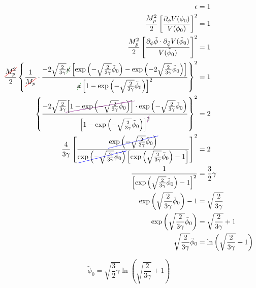 \begin{equation*}
    \begin{split}
        \epsilon &= 1\\
        \frac{M_p^2}{2} \left[ \frac{\partial_\phi V(\phi_0)}{V(\phi_0)} \right]^2 &= 1\\
        \frac{M_p^2}{2} \left[ \frac{\partial_{\phi} \tilde{\phi} \cdot \partial_{\tilde{\phi}} V(\tilde{\phi}_0)}{V(\tilde{\phi}_0)} \right]^2 &= 1\\
        \frac{\colorcancel{red}{M_p^2}}{2} \left\{ \frac{1}{\colorcancel{red}{M_p}} \cdot \frac{- 2 \sqrt{\frac{2}{3 \gamma}} \colorcancel{ForestGreen}{\kappa} \left[ \exp \left( - \sqrt{\frac{2}{3 \gamma}} \tilde{\phi}_0 \right) - \exp \left( - 2 \sqrt{\frac{2}{3 \gamma}} \tilde{\phi}_0 \right) \right]}{\colorcancel{ForestGreen}{\kappa} \left[ 1 - \exp \left( - \sqrt{\frac{2}{3 \gamma}} \tilde{\phi}_0 \right) \right]^2} \right\}^2 &= 1\\
        \left\{ \frac{- 2 \sqrt{\frac{2}{3 \gamma}} \colorcancel{violet}{\left[ 1 - \exp \left( - \sqrt{\frac{2}{3 \gamma}} \tilde{\phi}_0 \right) \right]} \cdot \exp \left( - \sqrt{\frac{2}{3 \gamma}} \tilde{\phi}_0 \right)}{\left[ 1 - \exp \left( - \sqrt{\frac{2}{3 \gamma}} \tilde{\phi}_0 \right) \right]^{\colorcancel{violet}{2}}} \right\}^2 &= 2\\
        \frac{4}{3 \gamma} \left[ \frac{\colorcancel{blue}{\exp \left( - \sqrt{\frac{2}{3 \gamma}} \tilde{\phi}_0 \right)}}{\colorcancel{blue}{\exp \left( - \sqrt{\frac{2}{3 \gamma}} \tilde{\phi}_0 \right)} \left[ \exp \left( \sqrt{\frac{2}{3 \gamma}} \tilde{\phi}_0 \right) - 1 \right]} \right]^2 &= 2\\
        \frac{1}{\left[ \exp \left( \sqrt{\frac{2}{3 \gamma}} \tilde{\phi}_0 \right) - 1 \right]^2} &= \frac{3}{2} \gamma\\
        \exp \left( \sqrt{\frac{2}{3 \gamma}} \tilde{\phi}_0 \right) - 1 &= \sqrt{\frac{2}{3 \gamma}}\\
        \exp \left( \sqrt{\frac{2}{3 \gamma}} \tilde{\phi}_0 \right) &= \sqrt{\frac{2}{3 \gamma}} + 1\\
        \sqrt{\frac{2}{3 \gamma}} \tilde{\phi}_0 &= \ln \left( \sqrt{\frac{2}{3 \gamma}} + 1 \right)
    \end{split}
\end{equation*}

\begin{equation}
    \tilde{\phi}_0 = \sqrt{\frac{3}{2} \gamma} \ln \left( \sqrt{\frac{2}{3 \gamma}} + 1 \right)
\end{equation}

